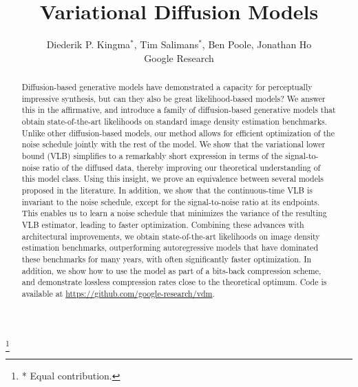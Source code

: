 \documentclass{article}
\title{Variational Diffusion Models}
\author{Diederik P. Kingma$^*$, Tim Salimans$^*$, Ben Poole, Jonathan Ho\\
  Google Research\\
}
\begin{document}
{\let\thefootnote\relax\footnote{* Equal contribution.}}
\maketitle

\begin{abstract}
Diffusion-based generative models have demonstrated a capacity for perceptually impressive synthesis, but can they also be great likelihood-based models? We answer this in the affirmative, and introduce a family of diffusion-based generative models that obtain state-of-the-art likelihoods on standard image density estimation benchmarks. Unlike other diffusion-based models, our method allows for efficient optimization of the noise schedule jointly with the rest of the model. We show that the variational lower bound (VLB) simplifies to a remarkably short expression in terms of the signal-to-noise ratio of the diffused data, thereby improving our theoretical understanding of this model class. Using this insight, we prove an equivalence between several models proposed in the literature. In addition, we show that the continuous-time VLB is invariant to the noise schedule, except for the signal-to-noise ratio at its endpoints. This enables us to learn a noise schedule that minimizes the variance of the resulting VLB estimator, leading to faster optimization. Combining these advances with architectural improvements, we obtain state-of-the-art likelihoods on image density estimation benchmarks, outperforming autoregressive models that have dominated these benchmarks for many years, with often significantly faster optimization. In addition, we show how to use the model as part of a bits-back compression scheme, and demonstrate lossless compression rates close to the theoretical optimum. Code is available at \url{https://github.com/google-research/vdm}.














\end{abstract}
\end{document}
